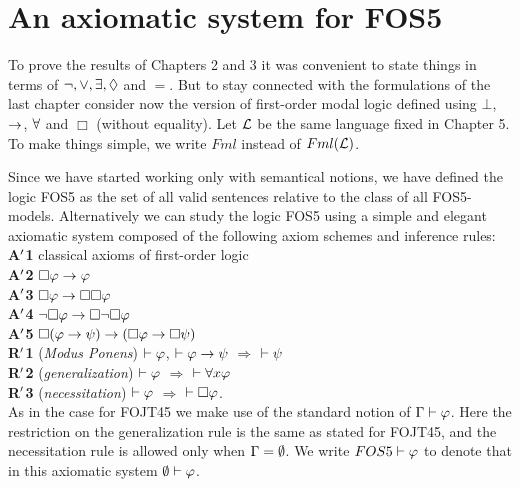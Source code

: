 
\section{An axiomatic system for FOS5}

\qquad To prove the results of Chapters 2 and 3 it was convenient to state things in terms of $\neg, \vee, \exists, \Diamond$ and $=$. But to stay connected with the formulations of the last chapter consider now the version of first-order modal logic defined using $\bot$, $\rightarrow$, $\forall$ and $\Box$ (without equality). Let $\mathcal{L}$ be the same language fixed in Chapter 5. To make things simple, we write $Fml$ instead of $Fml(\mathcal{L})$.   


\qquad Since we have started working only with semantical notions, we have defined the logic FOS5 as the set of all valid sentences relative to the class of all FOS5-models. Alternatively we can study the logic FOS5 using a simple and elegant axiomatic system composed of the following axiom schemes and inference rules:\\

\textbf{A$^{\prime}$1} classical axioms of first-order logic\\

\textbf{A$^{\prime}$2} $\Box \varphi \rightarrow \varphi$\\

\textbf{A$^{\prime}$3} $\Box \varphi \rightarrow \Box \Box \varphi$\\

\textbf{A$^{\prime}$4} $\neg \Box \varphi \rightarrow \Box \neg \Box \varphi$\\

\textbf{A$^{\prime}$5} $\Box (\varphi \rightarrow \psi) \rightarrow  (\Box \varphi \rightarrow \Box \psi)$\\
	
\textbf{R$^{\prime}$1} (\textit{Modus Ponens}) $\vdash \varphi$, $\vdash \varphi\rightarrow\psi$ $\Rightarrow$ $\vdash \psi$ \\

\textbf{R$^{\prime}$2} (\textit{generalization})  $\vdash \varphi$ $\Rightarrow$ $\vdash \forall x \varphi$ \\

\textbf{R$^{\prime}$3} (\textit{necessitation})  $\vdash \varphi$ $\Rightarrow$  $\vdash \Box \varphi$.\\


\qquad As in the case for FOJT45 we make use of the standard notion of $\Gamma \vdash \varphi$. Here the restriction on the generalization rule is the same as stated for FOJT45, and the necessitation rule is allowed only when $\Gamma = \emptyset$. We write $FOS5\vdash \varphi$ to denote that in this axiomatic system $\emptyset\vdash \varphi$.

